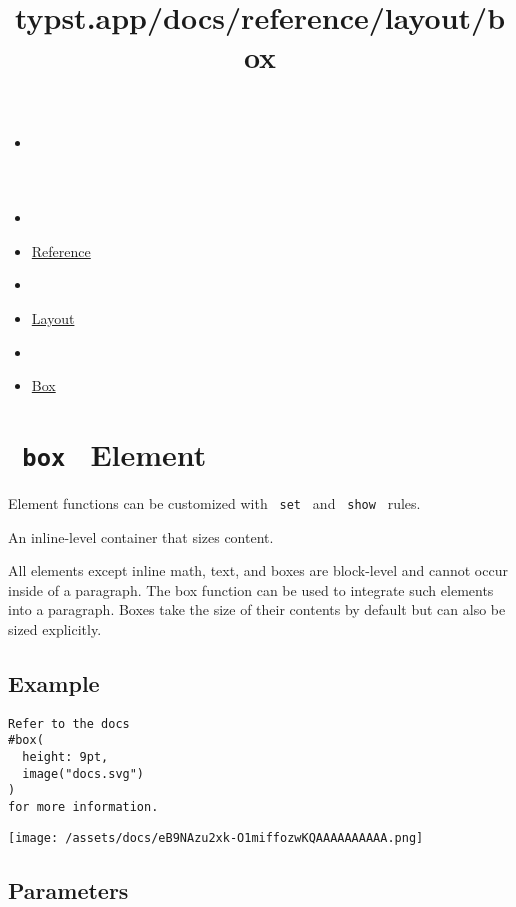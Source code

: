 \title{typst.app/docs/reference/layout/box}

\begin{itemize}
\tightlist
\item
  \href{/docs}{}
\item
  
\item
  \href{/docs/reference/}{Reference}
\item
  
\item
  \href{/docs/reference/layout/}{Layout}
\item
  
\item
  \href{/docs/reference/layout/box/}{Box}
\end{itemize}

\section{\texorpdfstring{\texttt{\ box\ } {{ Element
}}}{ box   Element }}\label{summary}

\label{element-tooltip}
Element functions can be customized with \texttt{\ set\ } and
\texttt{\ show\ } rules.

An inline-level container that sizes content.

All elements except inline math, text, and boxes are block-level and
cannot occur inside of a paragraph. The box function can be used to
integrate such elements into a paragraph. Boxes take the size of their
contents by default but can also be sized explicitly.

\subsection{Example}\label{example}

\begin{verbatim}
Refer to the docs
#box(
  height: 9pt,
  image("docs.svg")
)
for more information.
\end{verbatim}

\texttt{[image: /assets/docs/eB9NAzu2xk-O1miffozwKQAAAAAAAAAA.png]}

\subsection{\texorpdfstring{{ Parameters
}}{ Parameters }}\label{parameters}

